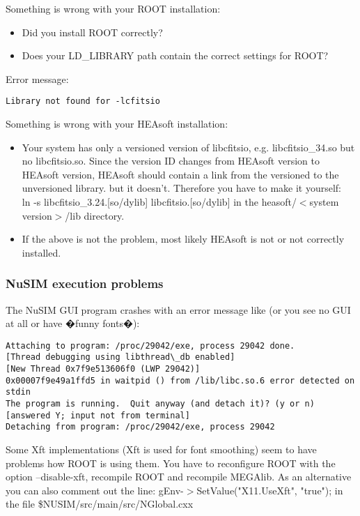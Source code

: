 Something is wrong with your ROOT installation:
\begin{itemize}
\item Did you install ROOT correctly?
\item	Does your LD\_LIBRARY path contain the correct settings for ROOT?
\end{itemize}
Error message:
\begin{verbatim}
Library not found for -lcfitsio
\end{verbatim}
Something is wrong with your HEAsoft installation:
\begin{itemize}
\item	Your system has only a versioned version of libcfitsio, e.g. libcfitsio\_34.so but no libcfitsio.so. Since the version ID changes from HEAsoft version to HEAsoft version, HEAsoft should contain a link from the versioned to the unversioned library. but it doesn't. Therefore you have to make it yourself:\\
ln -s libcfitsio\_3.24.[so/dylib] libcfitsio.[so/dylib]
in the heasoft/$<$system version$>$/lib directory.
\item	If the above is not the problem, most likely HEAsoft is not or not correctly installed.
\end{itemize}

\subsubsection{NuSIM execution problems}

The NuSIM GUI program crashes with an error message like (or you see no GUI at all or have �funny fonts�):
{\scriptsize \begin{verbatim}
Attaching to program: /proc/29042/exe, process 29042 done.
[Thread debugging using libthread\_db enabled]
[New Thread 0x7f9e513606f0 (LWP 29042)]
0x00007f9e49a1ffd5 in waitpid () from /lib/libc.so.6 error detected on stdin
The program is running.  Quit anyway (and detach it)? (y or n) [answered Y; input not from terminal]
Detaching from program: /proc/29042/exe, process 29042
\end{verbatim}}


Some Xft implementations (Xft is used for font smoothing) seem to have problems how ROOT is using them. You have to reconfigure ROOT with the option --disable-xft, recompile ROOT and recompile MEGAlib.
As an alternative you can also comment out the line:
gEnv-$>$SetValue("X11.UseXft", "true");
in the file \$NUSIM/src/main/src/NGlobal.cxx


